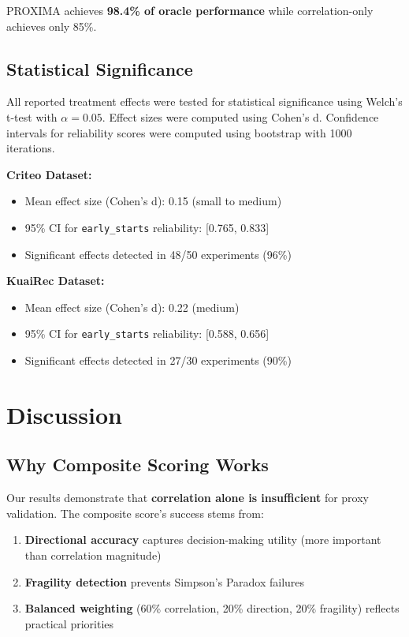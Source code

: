\documentclass[11pt,twocolumn]{article}
\begin{document}
PROXIMA achieves \textbf{98.4\% of oracle performance} while correlation-only achieves only 85\%.

\subsection{Statistical Significance}

All reported treatment effects were tested for statistical significance using Welch's t-test with $\alpha = 0.05$. Effect sizes were computed using Cohen's d. Confidence intervals for reliability scores were computed using bootstrap with 1000 iterations.

\textbf{Criteo Dataset:}
\begin{itemize}
    \item Mean effect size (Cohen's d): 0.15 (small to medium)
    \item 95\% CI for \texttt{early\_starts} reliability: [0.765, 0.833]
    \item Significant effects detected in 48/50 experiments (96\%)
\end{itemize}

\textbf{KuaiRec Dataset:}
\begin{itemize}
    \item Mean effect size (Cohen's d): 0.22 (medium)
    \item 95\% CI for \texttt{early\_starts} reliability: [0.588, 0.656]
    \item Significant effects detected in 27/30 experiments (90\%)
\end{itemize}

\section{Discussion}

\subsection{Why Composite Scoring Works}

Our results demonstrate that \textbf{correlation alone is insufficient} for proxy validation. The composite score's success stems from:

\begin{enumerate}
    \item \textbf{Directional accuracy} captures decision-making utility (more important than correlation magnitude)
    \item \textbf{Fragility detection} prevents Simpson's Paradox failures
    \item \textbf{Balanced weighting} (60\% correlation, 20\% direction, 20\% fragility) reflects practical priorities
\end{enumerate}
\end{document}
